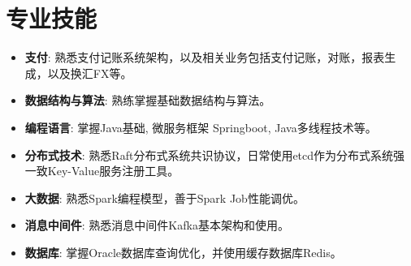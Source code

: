 \documentclass{resume}
\begin{document}
\section{专业技能}
\begin{itemize}[parsep=0.2ex]
\item \textbf{支付}: 熟悉支付记账系统架构，以及相关业务包括支付记账，对账，报表生成，以及换汇FX等。
\item \textbf{数据结构与算法}: 熟练掌握基础数据结构与算法。
\item \textbf{编程语言}: 掌握Java基础, 微服务框架 Springboot, Java多线程技术等。
\item \textbf{分布式技术}: 熟悉Raft分布式系统共识协议，日常使用etcd作为分布式系统强一致Key-Value服务注册工具。
\item \textbf{大数据}: 熟悉Spark编程模型，善于Spark Job性能调优。
\item \textbf{消息中间件}: 熟悉消息中间件Kafka基本架构和使用。
\item \textbf{数据库}: 掌握Oracle数据库查询优化，并使用缓存数据库Redis。
\end{itemize}
\end{document}
